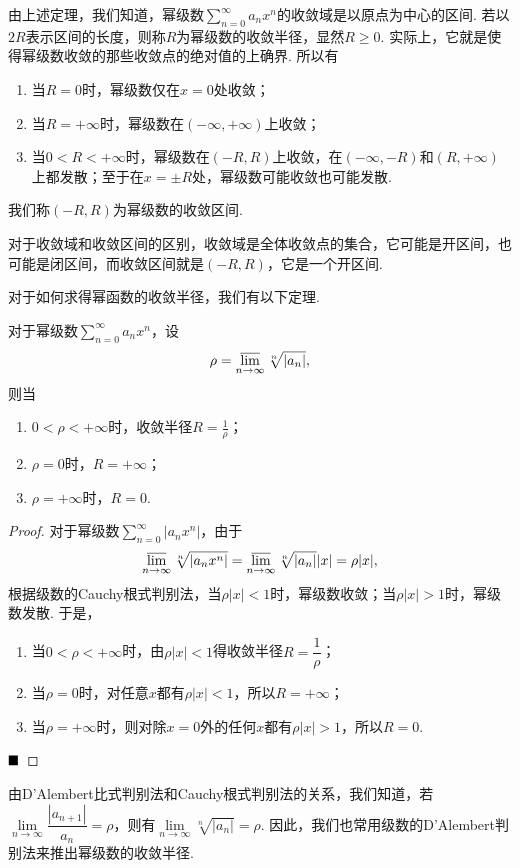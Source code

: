 由上述定理，我们知道，幂级数$\displaystyle\sum_{n=0}^{\infty}a_nx^n$的收敛域是以原点为中心的区间. 若以$2R$表示区间的长度，则称$R$为幂级数的{\heiti 收敛半径}，显然$R\geqslant 0$. 实际上，它就是使得幂级数收敛的那些收敛点的绝对值的上确界. 所以有
\begin{enumerate}[(1)]
	\item 当$R=0$时，幂级数仅在$x=0$处收敛；
	\item 当$R=+\infty$时，幂级数在$(-\infty,+\infty)$上收敛；
	\item 当$0<R<+\infty$时，幂级数在$(-R,R)$上收敛，在$(-\infty,-R)$和$(R,+\infty)$上都发散；至于在$x=\pm R$处，幂级数可能收敛也可能发散.
\end{enumerate}
我们称$(-R,R)$为幂级数的{\heiti 收敛区间}.

\begin{remark}
	对于收敛域和收敛区间的区别，收敛域是全体收敛点的集合，它可能是开区间，也可能是闭区间，而收敛区间就是$(-R,R)$，它是一个开区间.
\end{remark}
对于如何求得幂函数的收敛半径，我们有以下定理.
\begin{theorem}
	对于幂级数$\displaystyle\sum_{n=0}^{\infty}a_nx^n$，设
	$$\rho=\varlimsup\limits_{n\to\infty}\sqrt[n]{|a_n|},$$
	则当
	\begin{enumerate}[(1)]
		\item $0<\rho<+\infty$时，收敛半径$R=\frac{1}{\rho}$；
		\item $\rho=0$时，$R=+\infty$；
		\item $\rho=+\infty$时，$R=0$.
	\end{enumerate}
\end{theorem}
\begin{proof}
	对于幂级数$\displaystyle\sum_{n=0}^{\infty}|a_nx^n|$，由于
	$$\varlimsup\limits_{n\to\infty}\sqrt[n]{|a_nx^n|}=\varlimsup\limits_{n\to\infty}\sqrt[n]{|a_n|}|x|=\rho |x|,$$
	根据级数的Cauchy根式判别法，当$\rho |x|<1$时，幂级数收敛；当$\rho |x|>1$时，幂级数发散. 于是，
	\begin{enumerate}[(1)]
		\item 当$0<\rho<+\infty$时，由$\rho |x|<1$得收敛半径$R=\dfrac{1}{\rho}$；
		\item 当$\rho=0$时，对任意$x$都有$\rho |x|<1$，所以$R=+\infty$；
		\item 当$\rho=+\infty$时，则对除$x=0$外的任何$x$都有$\rho |x|>1$，所以$R=0$.
	\end{enumerate}
	$\hfill\blacksquare$
\end{proof}
由D'Alembert比式判别法和Cauchy根式判别法的关系，我们知道，若$\lim\limits_{n\to\infty}\dfrac{|a_{n+1}|}{a_n}=\rho$，则有$\lim\limits_{n\to\infty}\sqrt[n]{|a_n|}=\rho$. 因此，我们也常用级数的D'Alembert判别法来推出幂级数的收敛半径.

